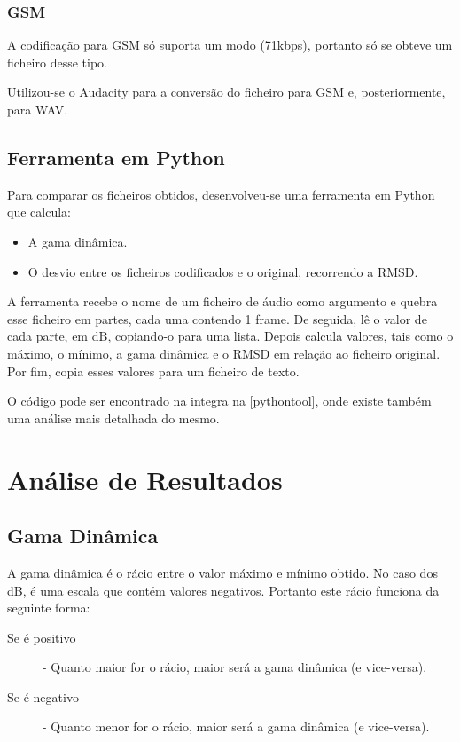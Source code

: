 \documentclass[a4paper]{report}
\begin{document}
\subsection{GSM}
\label{gsm}
A codificação para \gls{GSM} só suporta um modo (71kbps), portanto só se obteve um ficheiro desse tipo.

Utilizou-se o Audacity para a conversão do ficheiro para \gls{GSM} e, posteriormente, para \gls{WAV}.
\section{Ferramenta em Python}
\label{pytool}
Para comparar os ficheiros obtidos, desenvolveu-se uma ferramenta em Python que calcula:
\begin{itemize}
\item A gama dinâmica.
\item O desvio entre os ficheiros codificados e o original, recorrendo a \gls{RMSD}.
\end{itemize}

A ferramenta recebe o nome de um ficheiro de áudio como argumento e quebra esse ficheiro em partes, cada uma contendo 1 frame. De seguida, lê o valor de cada parte, em dB, copiando-o para uma lista. Depois calcula valores, tais como o máximo, o mínimo, a gama dinâmica e o \gls{RMSD} em relação ao ficheiro original. Por fim, copia esses valores para um ficheiro de texto.

O código pode ser encontrado na integra na \autoref{pythontool}, onde existe também uma análise mais detalhada do mesmo.

\chapter{Análise de Resultados}
\label{analise}

\section{Gama Dinâmica}
\label{dinamicrange}
A gama dinâmica é o rácio entre o valor máximo e mínimo obtido. No caso dos dB, é uma escala que contém valores negativos. Portanto este rácio funciona da seguinte forma: 
\begin{description}
\item[Se é positivo] - Quanto maior for o rácio, maior será a gama dinâmica (e vice-versa).
\item [Se é negativo] - Quanto menor for o rácio, maior será a gama dinâmica (e vice-versa).
\end{description}
\end{document}
